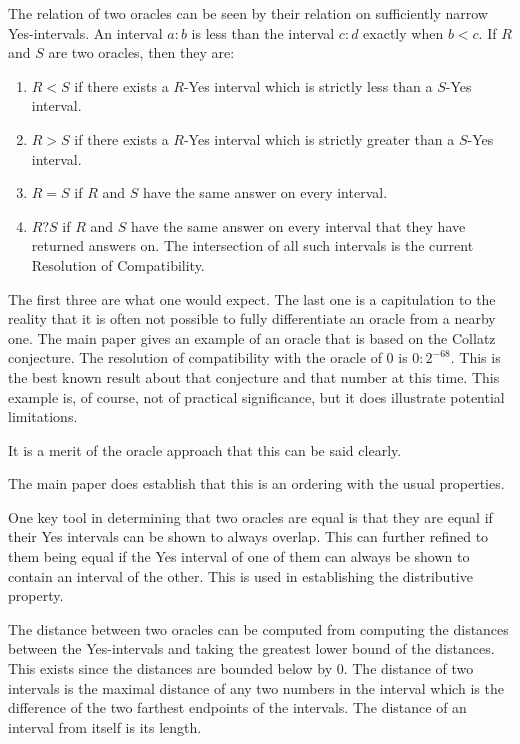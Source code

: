\documentclass[12pt]{article}
\theoremstyle{remark}
\begin{document}
The relation of two oracles can be seen by their relation on sufficiently narrow Yes-intervals. An interval $a:b$ is less than the interval $c:d$ exactly when $b < c$. If $R$ and $S$ are two oracles, then they are:
\begin{enumerate}
\item $R<S$ if there exists a $R$-Yes interval which is strictly less than a $S$-Yes interval.
\item $R>S$ if there exists a $R$-Yes interval which is strictly greater than a $S$-Yes interval.
\item $R=S$ if $R$ and $S$ have the same answer on every interval.
\item $R?S$ if $R$ and $S$ have the same answer on every interval that they have returned answers on. The intersection of all such intervals is the current Resolution of Compatibility. 
\end{enumerate}

The first three are what one would expect. The last one is a capitulation to the reality that it is often not possible to fully differentiate an oracle from a nearby one. The main paper gives an example of an oracle that is based on the Collatz conjecture. The resolution of compatibility with the oracle of 0 
 is $0:2^{-68}$. This is the best known result about that conjecture and that number at this time. This example is, of course, not of practical significance, but it does illustrate potential limitations. 

 It is a merit of the oracle approach that this can be said clearly. 

The main paper does establish that this is an ordering with the usual properties. 

One key tool in determining that two oracles are equal is that they are equal if their Yes intervals can be shown to always overlap. This can further refined to them being equal if the Yes interval of one of them can always be shown to contain an interval of the other. This is used in establishing the distributive property. 

The distance between two oracles can be computed from computing the distances between the Yes-intervals and taking the greatest lower bound of the distances. This exists since the distances are bounded below by 0. The distance of two intervals is the maximal distance of any two numbers in the interval which is the difference of the two farthest endpoints of the intervals. The distance of an interval from itself is its length. 
\end{document}
